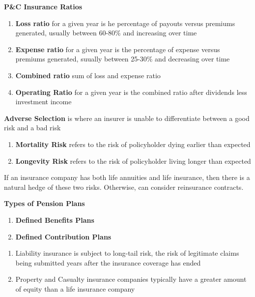 \documentclass[11pt,fleqn]{book} %
\numberwithin{equation}{section} %
\numberwithin{figure}{section} %
\numberwithin{table}{section} %
\begin{document}
\begin{definition}\textbf{P\&C Insurance Ratios}
\begin{enumerate}
    \item \textbf{Loss ratio} for a given year is he percentage of payouts versus premiums generated, usually between 60-80\% and increasing over time
    \item \textbf{Expense ratio} for a given year is the percentage of expense versus premiums generated, suually between 25-30\% and decreasing over time
    \item \textbf{Combined ratio} sum of loss and expense ratio
    \item \textbf{Operating Ratio} for a given year is the combined ratio after dividends less investment income
\end{enumerate}
\end{definition}
\begin{definition}\textbf{Adverse Selection} is where an insurer is unable to differentiate between a good risk and a bad risk
\end{definition}
\begin{definition}

\begin{enumerate}
    \item \textbf{Mortality Risk} refers to the risk of policyholder dying earlier than expected
    \item \textbf{Longevity Risk} refers to the risk of policyholder living longer than expected
\end{enumerate}
\begin{remark}
If an insurance company has both life annuities and life insurance, then there is a natural hedge of these two risks. Otherwise, can consider reinsurance contracts.
\end{remark}
\end{definition}

\begin{definition}\textbf{Types of Pension Plans}
\begin{enumerate}
    \item \textbf{Defined Benefits Plans}
    \item \textbf{Defined Contribution Plans}
\end{enumerate}
\end{definition}
\begin{remark}
\begin{enumerate}
    \item Liability insurance is subject to long-tail risk, the risk of legitimate claims being submitted years after the insurance coverage has ended
    \item Property and Casualty insurance companies typically have a greater amount of equity than a life insurance company
\end{enumerate}
\end{remark}
\end{document}
